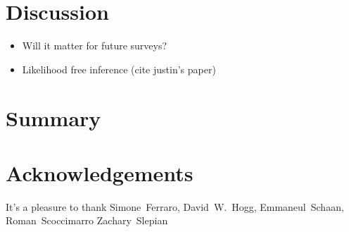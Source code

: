 \documentclass[12pt, letterpaper, preprint]{aastex}
\newcommand{\bitem}{\begin{itemize}}
\newcommand{\eitem}{\end{itemize}}
\begin{document}
\section{Discussion}
\bitem
    \item Will it matter for future surveys? 
    \item Likelihood free inference (cite justin's paper) 
\eitem

\section{Summary}


\section*{Acknowledgements}
It's a pleasure to thank 
    Simone~Ferraro,
    David~W.~Hogg,
    Emmaneul~Schaan, 
    Roman~Scoccimarro
    Zachary~Slepian



\end{document}
